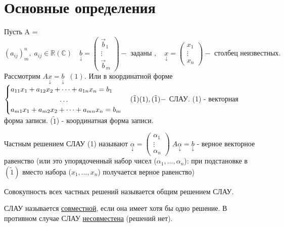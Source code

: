 \documentclass[../main.tex]{subfiles}
\begin{document}
\section{Основные определения}
\noindent Пусть A = $(a_{ij})_{m}^{n},\; a_{ij}\in\mathbb{R}(\mathbb{C})\quad \underset{\downarrow}{b}=\begin{pmatrix} \vec{b}_{1}\\ \vdots\\ \vec{b}_{m} \end{pmatrix}- \text{ заданы },\quad \underset{\downarrow}{x}=\begin{pmatrix} {x}_{1}\\ \vdots\\ {x}_{n} \end{pmatrix} -\text{ столбец неизвестных.}$\\ 
Рассмотрим $A \underset{\downarrow}{x}=\underset{\downarrow}{b}\;\;(1).$ Или в координатной форме $\begin{cases}
    a_{11}x_{1}+a_{12}x_{2}+\dots+a_{1n}x_{n}=b_{1}\\
    \phantom{a_{11}x_{1}+a_{12}x_{2}+} \dots\\
    a_{m1}x_{1}+a_{m2}x_{2}+\dots+a_{mn}x_{n}=b_{m}
\end{cases}(\tilde{1})\\ (1),(\tilde{1}) - $ СЛАУ. (1) - векторная форма записи. ($\tilde{1}$) - координатная форма записи. 
\begin{definition}
    Частным решением СЛАУ (1) называют $\underset{\downarrow}{\alpha}=\begin{pmatrix} {\alpha}_{1}\\ \vdots\\ {\alpha}_{n} \end{pmatrix}\; A  \underset{\downarrow}{\alpha}=\underset{\downarrow}{b}$ - верное векторное равенство (или это упорядоченный набор чисел ($\alpha_{1},\dots,\alpha_{n}$): при подстановке в $(\tilde{1})$ вместо набора ($x_{1},\dots,x_{n}$) получается верное равенство)
\end{definition}
\begin{definition}
    Совокупность всех частных решений называется общим решением СЛАУ.
\end{definition}
\begin{definition}
    СЛАУ называется \underline{совместной}, если она имеет хотя бы одно решение. В противном случае СЛАУ \underline{несовместена} (решений нет).
\end{definition}
\end{document}
